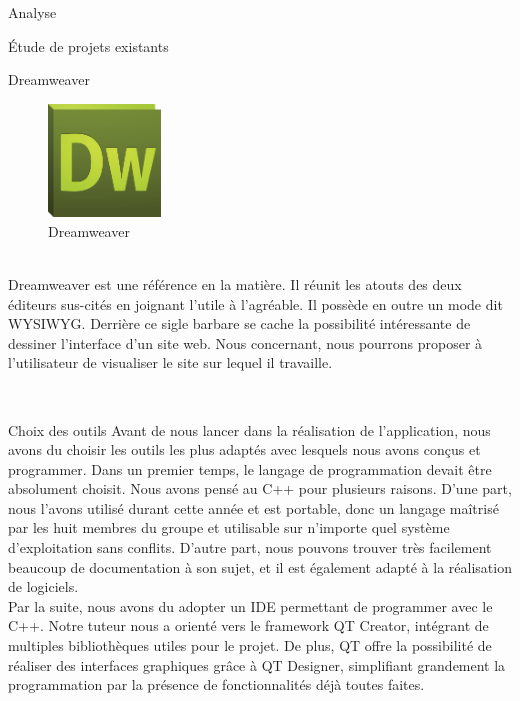 \documentclass[a4paper, 12pt]{report}
\begin{document}
\begin{part}{Analyse}
\begin{chapter}{Étude de projets existants}
			~\\
			\begin{section}{Dreamweaver}
				\begin{figure}[h]
					\begin{center}
						\includegraphics[width=3cm]{images/logoDreamweaver.png}
						\caption{Dreamweaver}
					\end{center}
				\end{figure}~\\
				Dreamweaver est une référence en la matière. Il réunit les atouts des deux éditeurs sus-cités en joignant l'utile à l'agréable.
				Il possède en outre un mode dit WYSIWYG. Derrière ce sigle barbare se cache la possibilité intéressante de dessiner l'interface d'un site web.
				Nous concernant, nous pourrons proposer à l'utilisateur de visualiser le site sur lequel il travaille.
			\end{section}
			~\\
		\end{chapter}
		\begin{chapter}{Choix des outils}
			Avant de nous lancer dans la réalisation de l'application, nous avons du choisir les outils les plus adaptés avec lesquels 
			nous avons conçus et programmer. Dans un premier temps, le langage de programmation devait être absolument choisit. 
			Nous avons pensé au C++ pour plusieurs raisons. D'une part, nous l'avons utilisé durant cette année et est portable, 
			donc un langage maîtrisé par les huit membres du groupe et utilisable sur n'importe quel système d'exploitation sans conflits.
			D'autre part, nous pouvons trouver très facilement beaucoup de documentation à son sujet, et il est également adapté à la 
			réalisation de logiciels. %
			\\
			Par la suite, nous avons du adopter un IDE permettant de programmer avec le C++. 
			Notre tuteur nous a orienté vers le framework QT Creator, intégrant de multiples bibliothèques utiles pour le projet. 
			De plus, QT offre la possibilité de réaliser des interfaces graphiques grâce à QT Designer, simplifiant grandement la programmation par
			la présence de fonctionnalités déjà toutes faites.%

\end{chapter}
\end{part}
\end{document}
